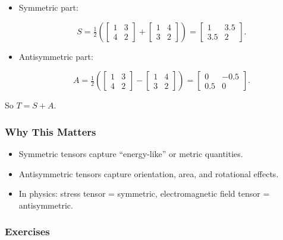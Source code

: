 \documentclass[
  letterpaper,
  DIV=11,
  numbers=noendperiod]{scrreprt}
\providecommand{\tightlist}{%
  \setlength{\itemsep}{0pt}\setlength{\parskip}{0pt}}
\begin{document}
\begin{itemize}
\item
  Symmetric part:

  \[
  S = \tfrac{1}{2}\left(\begin{bmatrix} 1 & 3 \\ 4 & 2 \end{bmatrix} + \begin{bmatrix} 1 & 4 \\ 3 & 2 \end{bmatrix}\right)
  = \begin{bmatrix} 1 & 3.5 \\ 3.5 & 2 \end{bmatrix}.
  \]
\item
  Antisymmetric part:

  \[
  A = \tfrac{1}{2}\left(\begin{bmatrix} 1 & 3 \\ 4 & 2 \end{bmatrix} - \begin{bmatrix} 1 & 4 \\ 3 & 2 \end{bmatrix}\right)
  = \begin{bmatrix} 0 & -0.5 \\ 0.5 & 0 \end{bmatrix}.
  \]
\end{itemize}

So \(T = S + A\).

\subsubsection{Why This Matters}\label{why-this-matters-62}

\begin{itemize}
\tightlist
\item
  Symmetric tensors capture ``energy-like'' or metric quantities.
\item
  Antisymmetric tensors capture orientation, area, and rotational
  effects.
\item
  In physics: stress tensor = symmetric, electromagnetic field tensor =
  antisymmetric.
\end{itemize}

\subsubsection{Exercises}\label{exercises-77}
\end{document}

